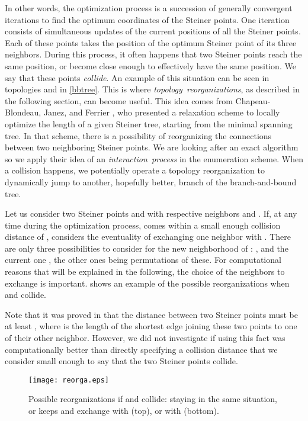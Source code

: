\documentclass{article}
\theoremstyle{plain}
\begin{document}
In other words, the optimization process is a succession of generally convergent iterations to find the optimum coordinates of the Steiner points. One iteration consists of simultaneous updates of the current positions of all the Steiner points. Each of these points takes the position of the optimum Steiner point of its three neighbors. During this process, it often happens that two Steiner points reach the same position, or become close enough to effectively have the same position. 
We say that these points \emph{collide}. 
An example of this situation can be seen in topologies  and  in \cref{bbtree}. 
This is where \mbox{\emph{topology reorganizations}}, as described in the following section, can become useful. 
This idea comes from Chapeau-Blondeau, Janez, and Ferrier \cite{ref3}, who presented a relaxation scheme to locally optimize the length of a given Steiner tree, starting from the minimal spanning tree. 
In that scheme, there is a possibility of reorganizing the connections between two neighboring Steiner points. 
We are looking after an exact algorithm so we apply their idea of an \mbox{\emph{interaction process}} in the enumeration scheme. 
When a collision happens, we potentially operate a topology reorganization to dynamically jump to another, hopefully better, branch of the branch-and-bound tree.


Let us consider two Steiner points  and  with respective neighbors  and . 
If, at any time during the optimization process,  comes within a small enough collision distance of ,  considers the eventuality of exchanging one neighbor with . 
There are only three possibilities to consider for the new neighborhood of : ,  and the current one , the other ones being permutations of these. 
For computational reasons that will be explained in the following, the choice of the neighbors to exchange is important. 
 shows an example of the possible reorganizations when  and  collide. 

Note that it was proved in \cite[paragraph 8.4]{Gilbert} that the distance between two Steiner points must be at least , where  is the length of the shortest edge joining these two points to one of their other neighbor. However, we did not investigate if using this fact was computationally better than directly specifying a collision distance that we consider small enough to say that the two Steiner points collide.


\begin{figure}
\begin{center}
\texttt{[image: reorga.eps]} 
\end{center}
\caption{Possible reorganizations if  and  collide: staying in the same situation, or  keeps  and exchange  with  (top), or with  (bottom).\label{Fig2}}
\end{figure}
\end{document}
